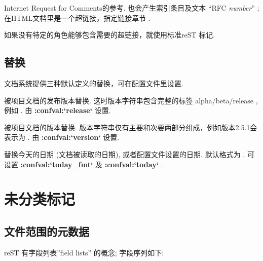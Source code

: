 \documentclass[letterpaper,10pt,english]{sphinxmanual}
\begin{document}

\begin{fulllineitems}
\label{markup/inline:role-rfc}
Internet Request for Comments的参考.  也会产生索引条目及文本 ``RFC \emph{number}'' ;
在HTML文档里是一个超链接，指定链接章节 .

\end{fulllineitems}


如果没有特定的角色能够包含需要的超链接，就使用标准reST 标记.


\subsection{替换}
\label{markup/inline:id13}\label{markup/inline:default-substitutions}
文档系统提供三种默认定义的替换，可在配置文件里设置.


\begin{fulllineitems}
被项目文档的发布版本替换.  这时版本字符串包含完整的标签 alpha/beta/release ,例如 .  由 {\color{red}\bfseries{}:confval:{}`release{}`} 设置.

\end{fulllineitems}



\begin{fulllineitems}
被项目文档的版本替换. 版本字符串仅有主要和次要两部分组成，例如版本2.5.1会表示为 .  由 {\color{red}\bfseries{}:confval:{}`version{}`} 设置.

\end{fulllineitems}



\begin{fulllineitems}
替换今天的日期 (文档被读取的日期), 或者配置文件设置的日期.  默认格式为 .  可设置 {\color{red}\bfseries{}:confval:{}`today\_fmt{}`} 及 {\color{red}\bfseries{}:confval:{}`today{}`} .

\end{fulllineitems}



\section{未分类标记}
\label{markup/misc::doc}\label{markup/misc:id1}

\subsection{文件范围的元数据}
\label{markup/misc:id2}\label{markup/misc:metadata}
reST 有字段列表''field lists'' 的概念; 字段序列如下:
\end{document}
